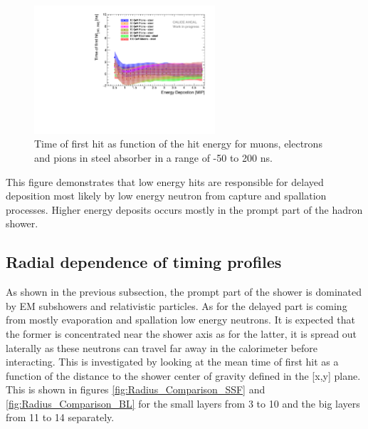 \begin{figure}[htbp!]
	\centering
	\includegraphics[width=0.6\textwidth]{chap5/fig_AHCAL_timing/Pions/Timing_Energy_Comparison_ShortAsymRange.pdf}
	\caption{Time of first hit as function of the hit energy for muons, electrons and pions in steel absorber in a range of -50 to 200 ns.}
	\label{fig:Energy_Comparison}
\end{figure}

This figure demonstrates that low energy hits are responsible for delayed deposition most likely by low energy neutron from capture and spallation processes. Higher energy deposits occurs mostly in the prompt part of the hadron shower.

\subsection{Radial dependence of timing profiles}

As shown in the previous subsection, the prompt part of the shower is dominated by EM subshowers and relativistic particles. As for the delayed part is coming from mostly evaporation and spallation low energy neutrons. It is expected that the former is concentrated near the shower axis as for the latter, it is spread out laterally as these neutrons can travel far away in the calorimeter before interacting. This is investigated by looking at the mean time of first hit as a function of the distance to the shower center of gravity defined in the [x,y] plane. This is shown in figures \ref{fig:Radius_Comparison_SSF} and \ref{fig:Radius_Comparison_BL} for the small layers from 3 to 10 and the big layers from 11 to 14 separately.

